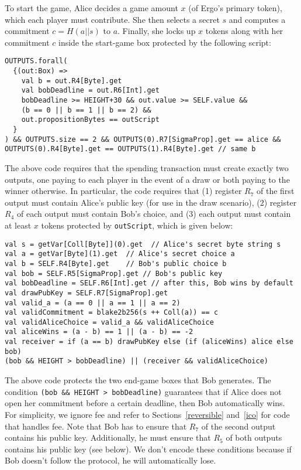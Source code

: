 \documentclass[runningheads]{llncs}
\begin{document}
To start the game, Alice decides a game amount $x$ (of Ergo's primary token), which each player must contribute. She then selects a secret $s$ and computes a commitment $c=H(a||s)$ to $a$. Finally, she locks up $x$ tokens along with her commitment $c$ inside the start-game box protected by the following script:
\small{
	\begin{verbatim}
OUTPUTS.forall(
  {(out:Box) =>
    val b = out.R4[Byte].get
    val bobDeadline = out.R6[Int].get
    bobDeadline >= HEIGHT+30 && out.value >= SELF.value &&
    (b == 0 || b == 1 || b == 2) && 
    out.propositionBytes == outScript
  }
) && OUTPUTS.size == 2 && OUTPUTS(0).R7[SigmaProp].get == alice &&
OUTPUTS(0).R4[Byte].get == OUTPUTS(1).R4[Byte].get // same b
	\end{verbatim}
}


The above code requires that the spending transaction must create exactly two outputs, one paying to each player in the event of a draw or both paying to the winner otherwise. In particular, the code requires that (1) register $R_7$ of the first output must contain Alice's public key (for use in the draw scenario), (2) register $R_4$ of each output must contain Bob's choice, and (3) each output must contain at least $x$ tokens protected by \texttt{outScript}, which is given below:

\small{
\begin{verbatim}
val s = getVar[Coll[Byte]](0).get  // Alice's secret byte string s
val a = getVar[Byte](1).get  // Alice's secret choice a
val b = SELF.R4[Byte].get    // Bob's public choice b
val bob = SELF.R5[SigmaProp].get // Bob's public key
val bobDeadline = SELF.R6[Int].get // after this, Bob wins by default
val drawPubKey = SELF.R7[SigmaProp].get
val valid_a = (a == 0 || a == 1 || a == 2) 
val validCommitment = blake2b256(s ++ Coll(a)) == c   
val validAliceChoice = valid_a && validAliceChoice
val aliceWins = (a - b) == 1 || (a - b) == -2
val receiver = if (a == b) drawPubKey else (if (aliceWins) alice else bob)
(bob && HEIGHT > bobDeadline) || (receiver && validAliceChoice)
\end{verbatim}
}


The above code protects the two end-game boxes that Bob generates. The condition \texttt{(bob \&\& HEIGHT > bobDeadline)} guarantees that if Alice does not open her commitment before a certain deadline, then Bob automatically wins. For simplicity, we ignore fee and refer to Sections~\ref{reversible} and~\ref{ico} for code that handles fee. 
Note that Bob has to ensure that $R_7$ of the second output contains his public key. Additionally, he must ensure that $R_5$ of both outputs contains his public key (see below). We don't encode these conditions because if Bob doesn't follow the protocol, he will automatically lose.
\end{document}
